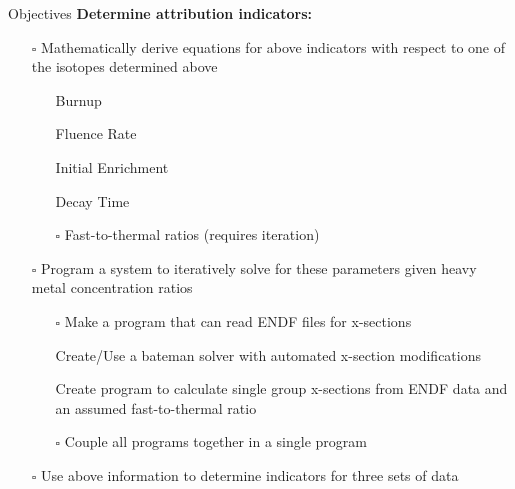 \documentclass{beamer}
\newcommand{\cmark}{\ding{51}}%
\newcommand{\done}{\rlap{$\square$}{\raisebox{2pt}{\large\hspace{1pt}\cmark}}%
  \hspace{-2.5pt}}
\newcommand{\notdone}{$\square$}
\begin{document}
\begin{frame}[allowframebreaks]{Objectives}
\vspace*{-1cm}
\textbf{\small Determine attribution indicators:}
\begin{itemize}
\item[\notdone]{\small Mathematically derive equations for above indicators with
  respect to one of the isotopes determined above}
  \begin{itemize}
  \item[\tiny\done]{\tiny Burnup}
  \item[\tiny\done]{\tiny Fluence Rate}
  \item[\tiny\done]{\tiny Initial Enrichment}
  \item[\tiny\done]{\tiny Decay Time}
  \item[\tiny\notdone]{\tiny Fast-to-thermal ratios (requires iteration)}
  \end{itemize}
\item[\notdone]{\small Program a system to iteratively solve for these parameters
  given heavy metal concentration
  ratios}
  \begin{itemize}
  \item[\tiny\notdone]{\tiny Make a program that can read ENDF files for x-sections}
  \item[\tiny\done]{\tiny Create/Use a bateman solver with automated x-section modifications}
  \item[\tiny\done]{\tiny Create program to calculate single group x-sections from
    ENDF data and an assumed
    fast-to-thermal ratio}
  \item[\tiny\notdone]{\tiny Couple all programs together in a single program} 
  \end{itemize}
\item[\notdone]{\small Use above information to determine indicators for three sets of data}
\end{itemize}
\end{frame}
\end{document}
